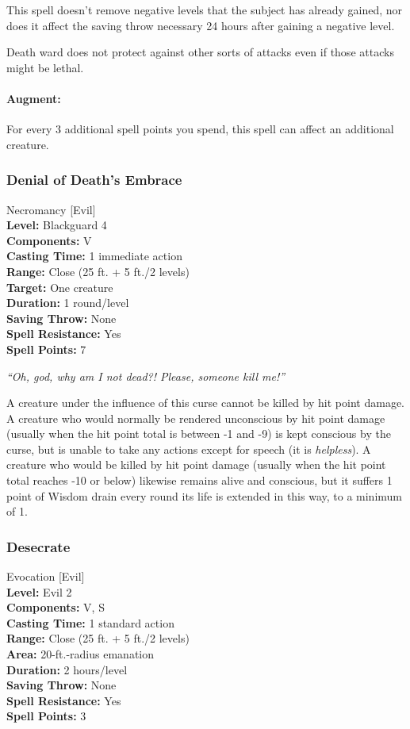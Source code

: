 This spell doesn't remove negative levels that the subject has already gained, 
nor does it affect the saving throw necessary 24 hours after gaining a negative level.

Death ward does not protect against other sorts of attacks even if those attacks might be lethal.

\paragraph{Augment:} For every 3 additional spell points you spend, this spell can affect an additional creature.
\subsubsection{Denial of Death's Embrace}
\label{Spell:DenialOfDeathsEmbrace}
Necromancy [Evil]
\\ \textbf{Level:} Blackguard 4
\\ \textbf{Components:} V
\\ \textbf{Casting Time:} 1 immediate action
\\ \textbf{Range:} Close (25 ft. + 5 ft./2 levels)
\\ \textbf{Target:} One creature
\\ \textbf{Duration:} 1 round/level
\\ \textbf{Saving Throw:} None
\\ \textbf{Spell Resistance:} Yes
\\ \textbf{Spell Points:} 7

\emph{``Oh, god, why am I not dead?! Please, someone kill me!''}

A creature under the influence of this curse cannot be killed by hit point damage. 
A creature who would normally be rendered unconscious by hit point damage (usually when the hit point total is between -1 and -9) is kept conscious by the curse, but is unable to take any actions except for speech (it is \emph{helpless}).
A creature who would be killed by hit point damage (usually when the hit point total reaches -10 or below) likewise remains alive and conscious, but it suffers 1 point of Wisdom drain every round its life is extended in this way, to a minimum of 1.
\subsubsection{Desecrate}
\label{Spell:Desecrate}
Evocation [Evil]
\\ \textbf{Level:} Evil 2
\\ \textbf{Components:} V, S
\\ \textbf{Casting Time:} 1 standard action
\\ \textbf{Range:} Close (25 ft. + 5 ft./2 levels)
\\ \textbf{Area:} 20-ft.-radius emanation
\\ \textbf{Duration:} 2 hours/level
\\ \textbf{Saving Throw:} None
\\ \textbf{Spell Resistance:} Yes
\\ \textbf{Spell Points:} 3

